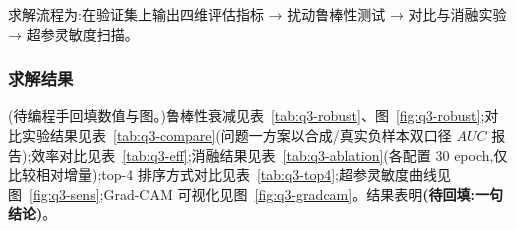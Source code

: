 求解流程为:在验证集上输出四维评估指标 → 扰动鲁棒性测试 → 对比与消融实验 → 超参灵敏度扫描。

\subsubsection{求解结果}

(待编程手回填数值与图。)鲁棒性衰减见表~\ref{tab:q3-robust}、图~\ref{fig:q3-robust};对比实验结果见表~\ref{tab:q3-compare}(问题一方案以合成/真实负样本双口径 $AUC$ 报告);效率对比见表~\ref{tab:q3-eff};消融结果见表~\ref{tab:q3-ablation}(各配置 30 epoch,仅比较相对增量);top-4 排序方式对比见表~\ref{tab:q3-top4};超参灵敏度曲线见图~\ref{fig:q3-sens};Grad-CAM 可视化见图~\ref{fig:q3-gradcam}。结果表明\textbf{(待回填:一句结论)}。

%
